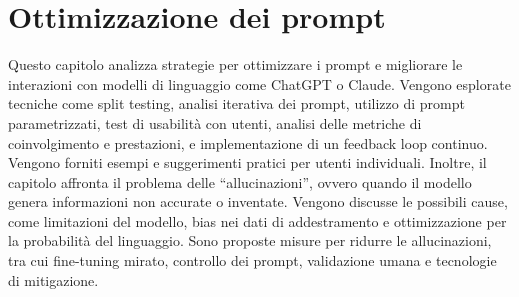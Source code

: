 \section{Ottimizzazione dei prompt}
    Questo capitolo analizza strategie per ottimizzare i prompt e migliorare le interazioni con modelli di linguaggio come ChatGPT o Claude. Vengono esplorate tecniche come split testing, analisi iterativa dei prompt, utilizzo di prompt parametrizzati, test di usabilità con utenti, analisi delle metriche di coinvolgimento e prestazioni, e implementazione di un feedback loop continuo. Vengono forniti esempi e suggerimenti pratici per utenti individuali. Inoltre, il capitolo affronta il problema delle ``allucinazioni'', ovvero quando il modello genera informazioni non accurate o inventate. Vengono discusse le possibili cause, come limitazioni del modello, bias nei dati di addestramento e ottimizzazione per la probabilità del linguaggio. Sono proposte misure per ridurre le allucinazioni, tra cui fine-tuning mirato, controllo dei prompt, validazione umana e tecnologie di mitigazione. 

